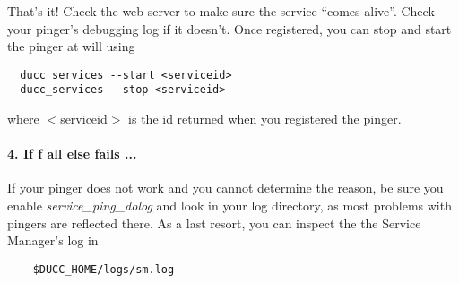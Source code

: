       That's it!  Check the web server to make sure the service ``comes alive''.  Check your pinger's
      debugging log if it doesn't.  Once registered, you can stop and start the pinger at will using
\begin{verbatim}
  ducc_services --start <serviceid>
  ducc_services --stop <serviceid>
\end{verbatim}
     where $<$serviceid$>$ is the id returned when you registered the pinger.

     \paragraph{4. If f  all  else fails ...}
     If your pinger does not work and you cannot determine the reason, be sure you enable {\em service\_ping\_dolog} and
     look in your log directory, as most problems with pingers are reflected there.  As a last resort, you can
     inspect the the Service Manager's log in
\begin{verbatim}
    $DUCC_HOME/logs/sm.log
\end{verbatim}
     
